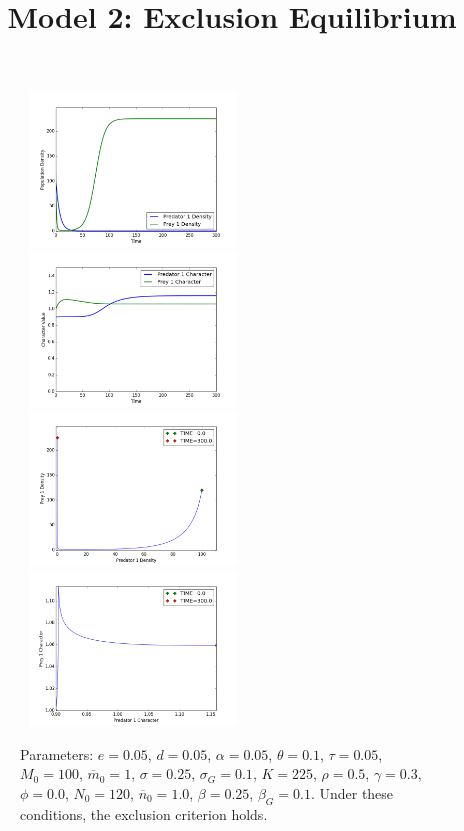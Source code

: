 \documentclass{amsart}
\theoremstyle{definition}
\theoremstyle{remark}
\numberwithin{equation}{section}
\begin{document}
\begin{centering}
	\begin{figure}
		\title{\bf Model 2: Exclusion Equilibrium\\}
		\includegraphics[width=6cm,height=4.1cm]{figures/1x1/variable_growth/stable_exclusion/densities.png}
		\includegraphics[width=6cm,height=4.1cm]{figures/1x1/variable_growth/stable_exclusion/traits.png}
		\includegraphics[width=6cm,height=4.1cm]{figures/1x1/variable_growth/stable_exclusion/density_phase_plane.png}
		\includegraphics[width=6cm,height=4.1cm]{figures/1x1/variable_growth/stable_exclusion/trait_phase_plane.png}
		\caption{\footnotesize Parameters: $e = 0.05$, $d = 0.05$, $\alpha = 0.05$, $\theta = 0.1$, $\tau = 0.05$, $M_0 = 100$, $\overline{m}_0 = 1$, $\sigma = 0.25$, $\sigma_G = 0.1$, $K = 225$, $\rho = 0.5$, $\gamma = 0.3$, $\phi = 0.0$, $N_0 = 120$, $\overline{n}_0 = 1.0$, $\beta = 0.25$, $\beta_G = 0.1$.  Under these conditions, the exclusion criterion holds.}

\end{figure}
\end{centering}
\end{document}
